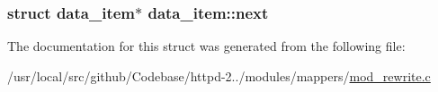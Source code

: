 \subsubsection[{\texorpdfstring{next}{next}}]{\setlength{\rightskip}{0pt plus 5cm}struct {\bf data\+\_\+item}$\ast$ data\+\_\+item\+::next}\hypertarget{structdata__item_a82d24fd484892bea951369356be2fa2b}{}\label{structdata__item_a82d24fd484892bea951369356be2fa2b}


The documentation for this struct was generated from the following file\+:\begin{DoxyCompactItemize}
\item 
/usr/local/src/github/\+Codebase/httpd-\/2../modules/mappers/\hyperlink{mod__rewrite_8c}{mod\+\_\+rewrite.\+c}\end{DoxyCompactItemize}
